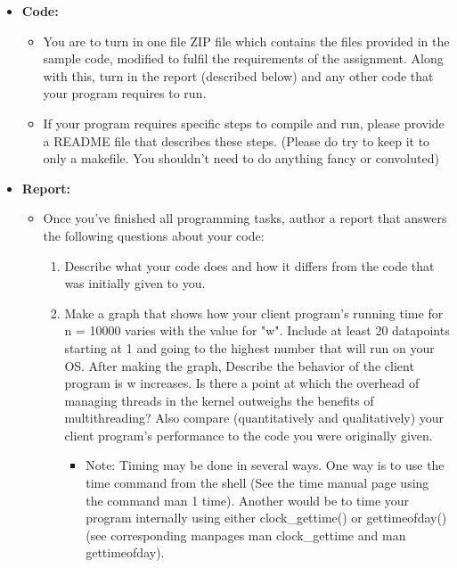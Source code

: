 \documentclass[12pt]{extarticle}
\begin{document}
\begin{itemize}
    \setlength\itemsep{-0.1em}

    \item \textbf{Code:}
    \begin{itemize}
        \setlength\itemsep{-0.1em}
        
        \item You are to turn in one file ZIP file which contains the files provided in the sample code, modified to fulfil the requirements of the assignment.  Along with this, turn in the report (described below) and any other code that your program requires to run.  
        \item If your program requires specific steps to compile and run, please provide a README file that describes these steps.  (Please do try to keep it to only a makefile.  You shouldn't need to do anything fancy or convoluted)
        
    \end{itemize}

    \item \textbf{Report:}
    \begin{itemize}
        \setlength\itemsep{-0.1em}
        
        \item Once you've finished all programming tasks, author a report that answers the following questions about your code:
        \begin{enumerate}
        
            \item Describe what your code does and how it differs from the code that was initially given to you.  
            \item Make a graph that shows how your client program's running time for n = 10000 varies with the value for "w".  Include at least 20 datapoints starting at 1 and going to the highest number that will run on your OS.  After making the graph, Describe the behavior of the client program is w increases.  Is there a point at which the overhead of managing threads in the kernel outweighs the benefits of multithreading?  Also compare (quantitatively and qualitatively) your client program's performance to the code you were originally given.  
            \begin{itemize}
                \setlength\itemsep{-0.1em}
                
                \item Note: Timing may be done in several ways.  One way is to use the time command from the shell (See the time manual page using the command man 1 time).  Another would be to time your program internally using either clock\_gettime() or gettimeofday() (see corresponding manpages man clock\_gettime and man gettimeofday). 
                

\end{itemize}
\end{enumerate}
\end{itemize}
\end{itemize}
\end{document}
